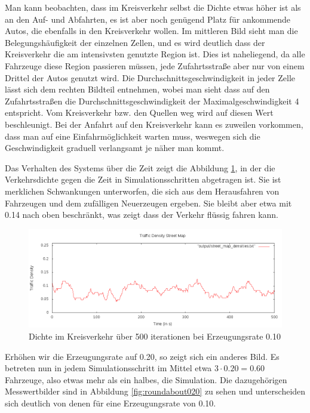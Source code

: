 \documentclass[10pt, a4paper]{article}
\begin{document}
Man kann beobachten, dass im Kreisverkehr selbst die Dichte etwas höher ist als an den Auf- und Abfahrten, es ist aber noch genügend Platz für ankommende Autos, die ebenfalls in den Kreisverkehr wollen. Im mittleren Bild sieht man die Belegungshäufigkeit der einzelnen Zellen, und es wird deutlich dass der Kreisverkehr die am intensivsten genutzte Region ist. Dies ist naheliegend, da alle Fahrzeuge diese Region passieren müssen, jede Zufahrtsstraße aber nur von einem Drittel der Autos genutzt wird. Die Durchschnittsgeschwindigkeit in jeder Zelle lässt sich dem rechten Bildteil entnehmen, wobei man sieht dass auf den Zufahrtsstraßen die Durchschnittsgeschwindigkeit der Maximalgeschwindigkeit 4 entspricht. Vom Kreisverkehr bzw. den Quellen weg wird auf diesen Wert beschleunigt. Bei der Anfahrt auf den Kreisverkehr kann es zuweilen vorkommen, dass man auf eine Einfahrmöglichkeit warten muss, weswegen sich die Geschwindigkeit graduell verlangsamt je näher man kommt.

Das Verhalten des Systems über die Zeit zeigt die Abbildung \ref{fig:roundabout010density}, in der die Verkehrsdichte gegen die Zeit in Simulationsschritten abgetragen ist. Sie ist merklichen Schwankungen unterworfen, die sich aus dem Herausfahren von Fahrzeugen und dem zufälligen Neuerzeugen ergeben. Sie bleibt aber etwa mit 0.14 nach oben beschränkt, was zeigt dass der Verkehr flüssig fahren kann.

\begin{figure}[h!]
	\centering
	\includegraphics[width=\textwidth]{img/roundabout_010_densities}
	\caption{Dichte im Kreisverkehr über 500 iterationen bei Erzeugungsrate 0.10}
	\label{fig:roundabout010density}
\end{figure}

Erhöhen wir die Erzeugungsrate auf 0.20, so zeigt sich ein anderes Bild. Es betreten nun in jedem Simulationsschritt im Mittel etwa $3 \cdot 0.20 = 0.60$ Fahrzeuge, also etwas mehr als ein halbes, die Simulation. Die dazugehörigen Messwertbilder sind in Abbildung \ref{fig:roundabout020} zu sehen und unterscheiden sich deutlich von denen für eine Erzeugungsrate von 0.10.
\end{document}
